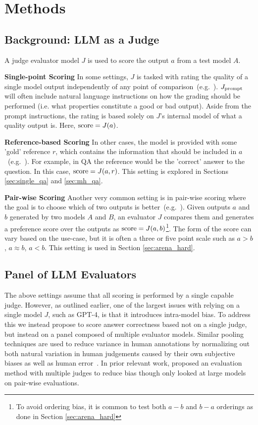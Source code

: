 \documentclass[11pt]{article}
\newcommand{\methodcaps}{Panel of LLM Evaluators\ }
\begin{document}
\section{Methods \label{sec:method}}
\subsection{Background: LLM as a Judge \label{sec:judge_background}}
A judge evaluator model $J$ is used to score the output $a$ from a test model $A$. 

\noindent\textbf{Single-point Scoring}
In some settings, $J$ is tasked with rating the quality of a single model output independently of any point of comparison~(e.g.~\citep{kocmi2023large}). $J_{\textup{prompt}}$ will often include natural language instructions on how the grading should be performed (i.e. what properties constitute a good or bad output). Aside from the prompt instructions, the rating is based solely on $J$'s internal model of what a quality output is. Here, $\textup{score}=J(a)$.

\noindent\textbf{Reference-based Scoring}
In other cases, the model is provided with some 'gold' reference $r$, which contains the information that should be included in $a$~(e.g.~\cite{zhu2023judgelm}). For example, in QA the reference would be the 'correct' answer to the question. In this case, $\textup{score}=J(a,r)$. This setting is explored in Sections \ref{sec:single_qa} and \ref{sec:mh_qa}.

\noindent\textbf{Pair-wise Scoring}
Another very common setting is in pair-wise scoring where the goal is to choose which of two outputs is better~(e.g.~\cite{zheng2024judging}). Given outputs $a$ and $b$ generated by two models $A$ and $B$, an evaluator $J$ compares them and generates a preference score over the outputs as $\textup{score}=J(a,b)$\footnote{To avoid ordering bias, it is common to test both $a-b$ and $b-a$ orderings as done in Section \ref{sec:arena_hard}}. The form of the score can vary based on the use-case, but it is often a three or five point scale such as $a>b$, $a\approx b$, $a<b$. This setting is used in Section \ref{sec:arena_hard}.

\subsection{\methodcaps}
The above settings assume that all scoring is performed by a single capable judge. However, as outlined earlier, one of the largest issues with relying on a single model $J$, such as GPT-4, is that it introduces intra-model bias. To address this we instead propose to score answer correctness based not on a single judge, but instead on a panel composed of multiple evaluator models. Similar pooling techniques are used to reduce variance in human annotations by normalizing out both natural variation in human judgements caused by their own subjective biases as well as human error~\cite{vorhees1998variation}. In prior relevant work, \citet{li2023prd} proposed an evaluation method with multiple judges to reduce bias though only looked at large models on pair-wise evaluations.
\end{document}

